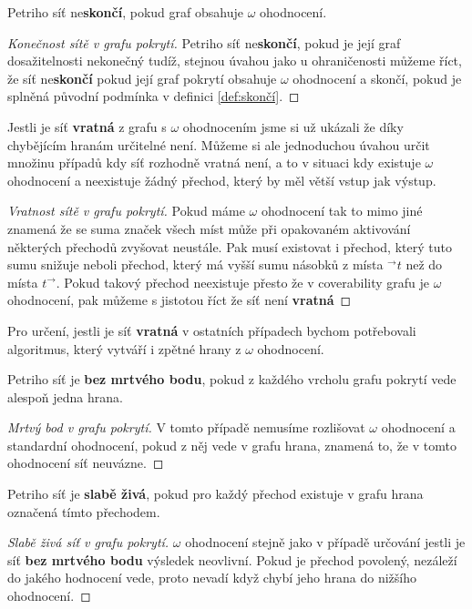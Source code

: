 \documentclass[
  biblatex,
  glossaries,
]{kidiplom}
\begin{document}
Petriho síť ne\textbf{skončí}, pokud graf obsahuje $\omega$ ohodnocení.
\begin{proof}[Konečnost sítě v grafu pokrytí]
  Petriho síť ne\textbf{skončí}, pokud je její graf dosažitelnosti nekonečný tudíž,
  stejnou úvahou jako u ohraničenosti můžeme říct, že síť ne\textbf{skončí}
  pokud její graf pokrytí obsahuje $\omega$ ohodnocení a skončí, pokud je splněná
  původní podmínka v definici \ref{def:skončí}.
\end{proof}


Jestli je síť \textbf{vratná} z grafu s $\omega$ ohodnocením jsme si už ukázali 
že díky chybějícím hranám určitelné není. Můžeme si ale jednoduchou 
úvahou určit množinu případů kdy síť rozhodně vratná není, a to v 
situaci kdy existuje $\omega$ ohodnocení a neexistuje žádný přechod, 
který by měl větší vstup jak výstup.
\begin{proof}[Vratnost sítě v grafu pokrytí]
  Pokud máme $\omega$ ohodnocení tak to mimo jiné znamená že se suma značek všech 
  míst může při opakovaném aktivování
  některých přechodů zvyšovat neustále. Pak musí existovat i přechod,
  který tuto sumu snižuje neboli přechod, který má vyšší sumu
  násobků z místa $^\to t$ než do místa $t ^\to$. Pokud takový 
  přechod neexistuje přesto že v coverability grafu je $\omega$ ohodnocení,
  pak můžeme s jistotou říct že síť není \textbf{vratná}
\end{proof}
Pro určení, jestli je síť \textbf{vratná} v ostatních případech
bychom potřebovali algoritmus, který vytváří i zpětné hrany z $\omega$ ohodnocení.


Petriho síť je \textbf{bez mrtvého bodu}, pokud z každého vrcholu grafu 
pokrytí vede alespoň jedna hrana.
\begin{proof}[Mrtvý bod v grafu pokrytí]
  V tomto případě nemusíme rozlišovat $\omega$ ohodnocení a standardní ohodnocení,
  pokud z něj vede v grafu hrana, znamená to, že v tomto ohodnocení síť neuvázne.
\end{proof}

Petriho síť je \textbf{slabě živá}, pokud pro každý přechod existuje 
v grafu hrana označená tímto přechodem.
\begin{proof}[Slabě živá síť v grafu pokrytí]
  $\omega$ ohodnocení stejně jako v případě 
  určování jestli je síť \textbf{bez mrtvého bodu} 
  výsledek neovlivní. Pokud je přechod povolený, 
  nezáleží do jakého hodnocení vede, 
  proto nevadí když chybí jeho hrana do nižšího ohodnocení.
\end{proof}
\end{document}
